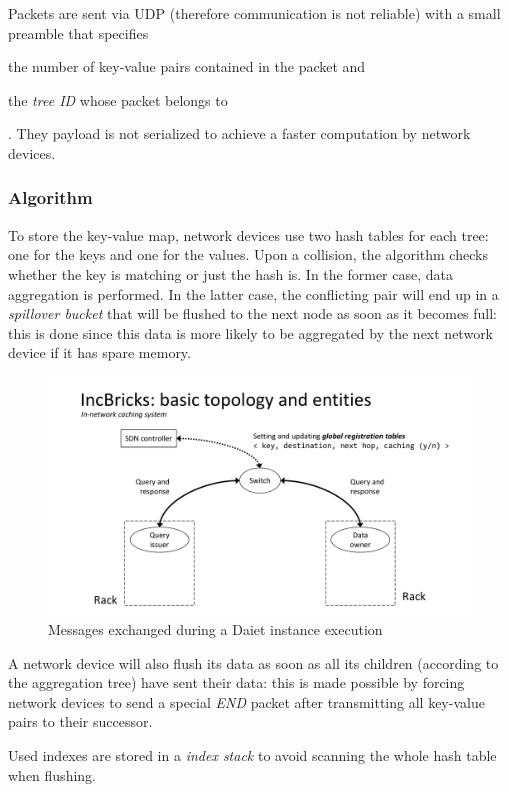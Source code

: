 Packets are sent via UDP (therefore communication is not reliable) with a small preamble that specifies
\begin{mylist}
    \item the number of key-value pairs contained in the packet and
    \item the \textit{tree ID} whose packet belongs to
\end{mylist}.
They payload is not serialized to achieve a faster computation by network devices.

\subsubsection{Algorithm} \label{daiet_algorithm}
To store the key-value map, network devices use two hash tables for each tree: one for the keys and one for the values.
Upon a collision, the algorithm checks whether the key is matching or just the hash is.
In the former case, data aggregation is performed.
In the latter case, the conflicting pair will end up in a \textit{spillover bucket} that will be flushed to the next node as soon as it becomes full: this is done since this data is more likely to be aggregated by the next network device if it has spare memory.

\begin{figure}[!htb]
    \centering
        \includegraphics[page=12, clip, trim=2.1cm 0.3cm 2cm 0.25cm, width=1.00\textwidth]{figures/analysis/inp/solutions.pdf}
    \caption{Messages exchanged during a Daiet \texorpdfstring{\cite{daiet}}{} instance execution}
\end{figure}

A network device will also flush its data as soon as all its children (according to the aggregation tree) have sent their data: this is made possible by forcing network devices to send a special \textit{END} packet after transmitting all key-value pairs to their successor.\par
Used indexes are stored in a \textit{index stack} to avoid scanning the whole hash table when flushing.

